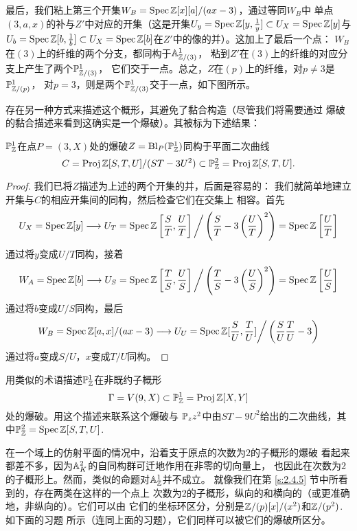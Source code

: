 最后，我们粘上第三个开集$W_B=\spec \zz[x][a]/(ax-3)$，通过等同$W_B$中
单点$(3,a,x)$的补与$Z'$中对应的开集（这是开集$U_y=\spec \zz[y,\frac 1y]
\subset U_X=\spec \zz[y]$与$U_b=\spec \zz[b,\frac 1b]
\subset U_X=\spec \zz[b]$在$Z'$中的像的并）。这加上了最后一个点：
$W_B$在$(3)$上的纤维的两个分支，都同构于$\A_{\zz/(3)}^1$，
粘到$Z'$在$(3)$上的纤维的对应分支上产生了两个$\P_{\zz/(3)}^1$，
它们交于一点。总之，$Z$在$(p)$上的纤维，对$p\neq 3$是$\P_{\zz/(p)}^1$，
对$p=3$，则是两个$\P_{\zz/(3)}^1$交于一点，如下图所示。

存在另一种方式来描述这个概形，其避免了黏合构造（尽管我们将需要通过
爆破的黏合描述来看到这确实是一个爆破）。其被标为下述结果：

\begin{pro}\label{pro:4.47}
$\P_\zz^1$在点$P=(3,X)$处的爆破$Z=\Bl_P(\P_\zz^1)$同构于平面二次曲线
\[
	C=\proj \zz[S,T,U]/(ST-3U^2)\subset \mathbb P_\zz^2=\proj \zz[S,T,U].
\]
\end{pro}


\begin{proof}
我们已将$Z$描述为上述的两个开集的并，后面是容易的：
我们就简单地建立开集与$C$的相应开集间的同构，然后检查它们在交集上
相容。首先
\[
	U_X=\spec \zz[y]\longrightarrow U_T=\spec \zz \left[\frac ST,\frac UT\right]\bigg / \left(\frac ST-3\left(\frac UT\right)^2\right)=\spec \zz \left[\frac UT\right]
\]
通过将$y$变成$U/T$同构，接着
\[
	W_A=\spec \zz[b]\longrightarrow U_S=\spec \zz \left[\frac TS,\frac US\right]\bigg / \left(\frac TS-3\left(\frac US\right)^2\right)=\spec \zz \left[\frac US\right]
\]
通过将$b$变成$U/S$同构，最后
\[
	W_B=\spec \zz[a,x]/(ax-3)\longrightarrow U_U=\spec \zz[\frac SU,\frac TU]\bigg / \left(\frac SU \frac TU-3\right)
\]
通过将$a$变成$S/U$，$x$变成$T/U$同构。
\end{proof}

\begin{exe}\label{exe:4.48}
用类似的术语描述$\P_\zz^1$在非既约子概形
\[
	\Gamma = V(9,X)\subset \mathbb P_\zz^1=\proj \zz[X,Y]
\]
处的爆破。用这个描述来联系这个爆破与
$\P_zz^2$中由$ST-9U^2$给出的二次曲线，其中$\P_\zz^2=\spec \zz[S,T,U]$.
\end{exe}

在一个域上的仿射平面的情况中，沿着支于原点的次数为$2$的子概形的爆破
看起来都差不多，因为$\A_K^2$的自同构群可迁地作用在非零的切向量上，
也因此在次数为$2$的子概形上。然而，类似的命题对$\A_\zz^1$并不成立。
就像我们在第 \ref{s:2.4.5} 节中所看到的，存在两类在这样的一个点上
次数为$2$的子概形，纵向的和横向的（或更准确地，非纵向的）。它们可以由
它们的坐标环区分，分别是$\zz/(p)[x]/(x^2)$和$\zz/(p^2)$. 如下面的习题
所示（连同上面的习题），它们同样可以被它们的爆破所区分。

